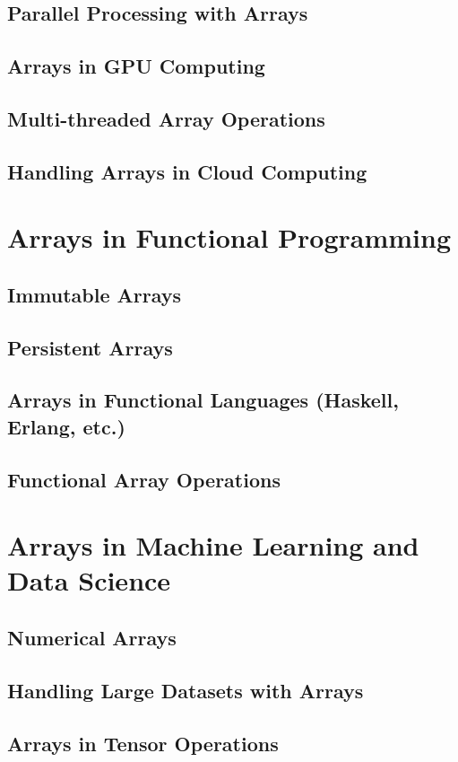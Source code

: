 \documentclass[12pt, oneside]{book}
\begin{document}
\section{Parallel Processing with Arrays}
\section{Arrays in GPU Computing}
\section{Multi-threaded Array Operations}
\section{Handling Arrays in Cloud Computing}

\chapter{Arrays in Functional Programming}
\section{Immutable Arrays}
\section{Persistent Arrays}
\section{Arrays in Functional Languages (Haskell, Erlang, etc.)}
\section{Functional Array Operations}
	
\chapter{Arrays in Machine Learning and Data Science}
\section{Numerical Arrays}
\section{Handling Large Datasets with Arrays}
\section{Arrays in Tensor Operations}
\end{document}
